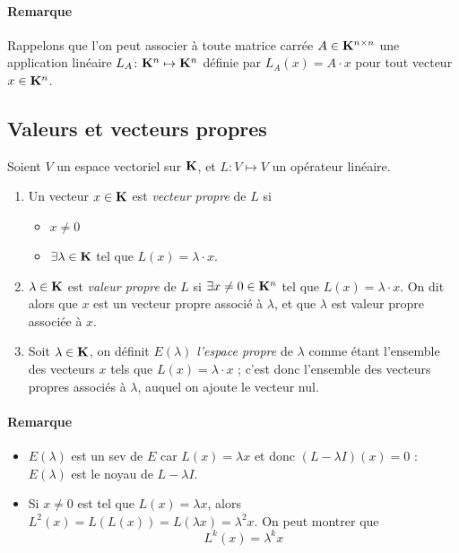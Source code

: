 \paragraph{Remarque}

Rappelons que l'on peut associer à toute matrice carrée $A \in \mathbf{K}^{n\times n}$ une application linéaire $L_A \colon \mathbf{K}^n \mapsto \mathbf{K}^n$ définie par $L_A(x) = A \cdot x$ pour tout vecteur $x \in \mathbf{K}^n$.

\subsection{Valeurs et vecteurs propres}

\begin{defn}
Soient $V$ un espace vectoriel sur $\mathbf{K}$, et $L \colon V \mapsto V$ un opérateur linéaire.
\begin{enumerate}
\item Un vecteur $x \in \mathbf{K}$ est \emph{vecteur propre} de $L$ si
	\begin{itemize}
	\item $x \neq 0$
	\item $\exists \lambda \in \mathbf{K}$ tel que $L(x) = \lambda \cdot x$.
	\end{itemize}
\item $\lambda \in \mathbf{K}$ est \emph{valeur propre} de $L$ si $\exists x\neq 0 \in \mathbf{K}^n$ tel que $L(x)=\lambda \cdot x$. On dit alors que $x$ est un vecteur propre associé à $\lambda$, et que $\lambda$ est valeur propre associée à $x$.
\item Soit $\lambda \in \mathbf{K}$, on définit $E(\lambda)$ \emph{l'espace propre} de $\lambda$ comme étant l'ensemble des vecteurs $x$ tels que $L(x)=\lambda \cdot x$ ; c'est donc l'ensemble des vecteurs propres associés à $\lambda$, auquel on ajoute le vecteur nul.
\end{enumerate}
\end{defn}

\paragraph{Remarque}

\begin{itemize}
\item $E(\lambda)$ est un sev de $E$ car $L(x)=\lambda x$ et donc $(L-\lambda I)(x)=0$ : $E(\lambda)$ est le noyau de $L-\lambda I$.
\item Si $x\neq 0$ est tel que $L(x)=\lambda x$, alors $L^2(x)=L(L(x)) = L(\lambda x) = \lambda^2 x$. On peut montrer que
\begin{equation}
\label{oplin_puiss_vecteur_propre}
L^k(x)=\lambda^k x
\end{equation}
\end{itemize}

